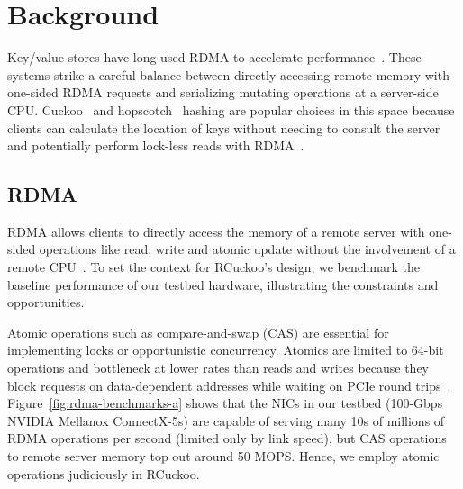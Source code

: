 
\section{Background}
\label{sec:background}



Key/value stores have long used RDMA to
accelerate
performance~\cite{farm,memc3,erpc,herd,faast,mica,pilaf,cell,storm}.
These systems strike a careful balance between directly accessing remote memory with one-sided RDMA requests and
serializing mutating operations at a server-side CPU.
Cuckoo~\cite{cuckoo} and hopscotch~\cite{hopscotch} hashing are popular choices in
this space because clients can calculate the location of
keys without needing to consult the server and potentially perform
lock-less reads with RDMA~\cite{farm,pilaf,cuckoo}.



\subsection{RDMA}

RDMA
allows
clients to directly access the memory of a remote server with
one-sided operations like read, write and atomic update without the
involvement of a remote CPU~\cite{infiniband-spec}.  To set the
context for RCuckoo's design, we benchmark the baseline performance of
our testbed hardware, illustrating the constraints and
opportunities.

Atomic operations such as compare-and-swap (CAS) are essential for
implementing locks or opportunistic concurrency. Atomics are limited
to 64-bit operations and bottleneck at lower rates than reads and
writes because they block requests on data-dependent addresses while
waiting on PCIe round trips~\cite{design-guidelines,sherman}.
Figure~\ref{fig:rdma-benchmarks-a} shows that the NICs in our testbed
(100-Gbps NVIDIA Mellanox ConnectX-5s) are capable of serving many 10s of
millions of RDMA operations per second (limited only by link speed),
but CAS operations to remote server memory top out around 50 MOPS.  Hence, we employ atomic operations judiciously in RCuckoo.

